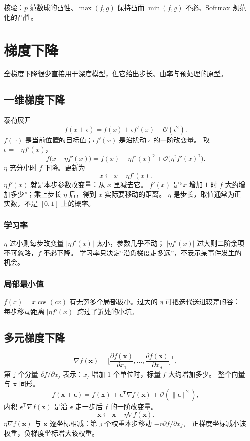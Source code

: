 核验：$p$ 范数球的凸性、$\max(f,g)$ 保持凸而 $\min(f,g)$ 不必、Softmax 规范化的凸性。

\section{梯度下降}

全梯度下降很少直接用于深度模型，但它给出步长、曲率与预处理的原型。

\subsection{一维梯度下降}

泰勒展开
\[
f(x+\epsilon)=f(x)+\epsilon f'(x)+\mathcal{O}(\epsilon^2).
\]
$f(x)$ 是当前位置的目标值；$\epsilon f'(x)$ 是沿扰动 $\epsilon$ 的一阶改变量。
取 $\epsilon=-\eta f'(x)$，
\[
f\bigl(x-\eta f'(x)\bigr)
=
f(x)-\eta f'(x)^2+\mathcal{O}\bigl(\eta^2 f'(x)^2\bigr).
\]
$\eta$ 充分小时 $f$ 下降。更新为
\[
x\leftarrow x-\eta f'(x).
\]
$\eta f'(x)$ 就是本步参数改变量：从 $x$ 里减去它。
$f'(x)$ 是“$x$ 增加 $1$ 时 $f$ 大约增加多少”；乘上步长 $\eta$ 后，得到 $x$ 实际要移动的距离。
$\eta$ 是步长，取值通常为正实数，不是 $[0,1]$ 上的概率。

\subsubsection{学习率}

$\eta$ 过小则每步改变量 $\lvert\eta f'(x)\rvert$ 太小，参数几乎不动；
$|\eta f'(x)|$ 过大则二阶余项不可忽略，$f$ 不必下降。
学习率只决定“沿负梯度走多远”，不表示某事件发生的机会。

\subsubsection{局部最小值}

$f(x)=x\cos(cx)$ 有无穷多个局部极小。过大的 $\eta$ 可把迭代送进较差的谷：
每步移动距离 $|\eta f'(x)|$ 跨过了近处的小坑。

\subsection{多元梯度下降}

\[
\nabla f(\bm{x})
=
\biggl[
\frac{\partial f(\bm{x})}{\partial x_1},\ldots,
\frac{\partial f(\bm{x})}{\partial x_d}
\biggr]^{\mathsf T},
\]
第 $j$ 个分量 $\partial f/\partial x_j$ 表示：$x_j$ 增加 $1$ 个单位时，标量 $f$ 大约增加多少。
整个向量与 $\bm{x}$ 同形。
\[
f(\bm{x}+\bm{\epsilon})
=
f(\bm{x})+\bm{\epsilon}^{\mathsf T}\nabla f(\bm{x})
+\mathcal{O}(\|\bm{\epsilon}\|^2),
\]
内积 $\bm{\epsilon}^{\mathsf T}\nabla f(\bm{x})$ 是沿 $\bm{\epsilon}$ 走一步后 $f$ 的一阶改变量。
\[
\bm{x}\leftarrow \bm{x}-\eta\nabla f(\bm{x}).
\]
$\eta\nabla f(\bm{x})$ 与 $\bm{x}$ 逐坐标相减：第 $j$ 个权重本步移动 $-\eta\partial f/\partial x_j$，
正梯度坐标减小该权重，负梯度坐标增大该权重。


